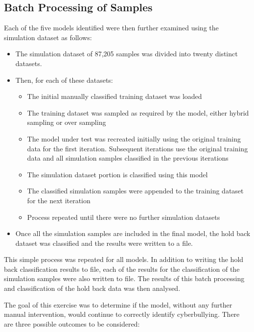 \subsection{Batch Processing of Samples}

Each of the five models identified were then further examined using the simulation dataset as follows:

\begin{itemize}

	\item The simulation dataset of 87,205 samples was divided into twenty distinct datasets.
	\item Then, for each of these datasets:
	
	\begin{itemize}
	
		\item The initial manually classified training dataset was loaded
		\item The training dataset was sampled as required by the model, either hybrid sampling or over sampling
		\item The model under test was recreated initially using the original training data for the first iteration. Subsequent iterations use the original training data and all simulation samples classified in the previous iterations
		\item The simulation dataset portion is classified using this model
		\item The classified simulation samples were appended to the training dataset for the next iteration
		\item Process repeated until there were no further simulation datasets 
	
	\end{itemize}
	
	\item Once all the simulation samples are included in the final model, the hold back dataset was classified and the results were written to a file.

\end{itemize}

This simple process was repeated for all models. In addition to writing the hold back classification results to file, each of the results for the classification of the simulation samples were also written to file. The results of this batch processing and classification of the hold back data was then analysed.

The goal of this exercise was to determine if the model, without any further manual intervention, would continue to correctly identify cyberbullying. There are three possible outcomes to be considered:

